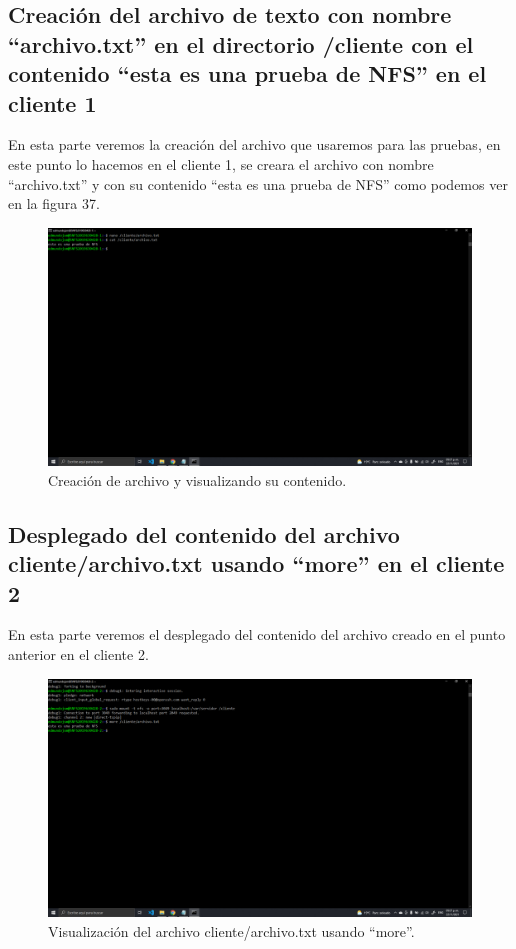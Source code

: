 \documentclass[11pt]{article}
\begin{document}
		\subsection{Creación del archivo de texto con nombre ``archivo.txt'' en el directorio /cliente con el contenido ``esta es una prueba de NFS'' en el cliente 1}
		En esta parte veremos la creación del archivo que usaremos para las pruebas, en este punto lo hacemos en el cliente 1, se creara el archivo con nombre ``archivo.txt'' y con su contenido ``esta es una prueba de NFS'' como podemos ver en la figura 37.
		\begin{figure}[H]
			\centering
			\includegraphics[scale=0.34]{resources/p5y6.png}
			\caption{Creación de archivo y visualizando su contenido.}\label{fig:picture}
		\end{figure}
		\subsection{Desplegado del contenido del archivo cliente/archivo.txt usando ``more'' en el cliente 2}
		En esta parte veremos el desplegado del contenido del archivo creado en el punto anterior en el cliente 2.
		\begin{figure}[H]
			\centering
			\includegraphics[scale=0.34]{resources/p7.png}
			\caption{Visualización del archivo cliente/archivo.txt usando ``more''.}\label{fig:picture}
		\end{figure}
\end{document}
